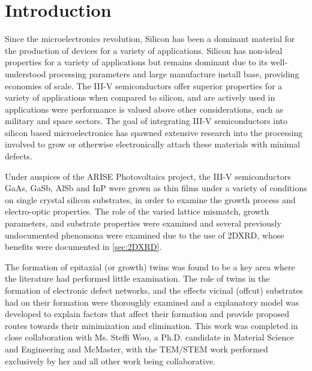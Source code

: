\section{Introduction}
Since the microelectronics revolution, Silicon has been a dominant material 
for the production of devices for a variety of applications. Silicon has 
non-ideal properties for a variety of applications but remains dominant due 
to its well-understood processing parameters and large manufacture install 
base, providing economies of scale. The III-V semiconductors offer superior 
properties for a variety of applications when compared to silicon, and are 
actively used in applications were performance is valued above other 
considerations, such as military and space sectors. The goal of integrating 
III-V semiconductors into silicon based microelectronics has spawned extensive 
research into the processing involved to grow or otherwise electronically 
attach these materials with minimal defects.

Under auspices of the ARISE Photovoltaics project, the III-V 
semiconductors GaAs, GaSb, AlSb and InP were grown as thin films under a 
variety of conditions on single crystal silicon substrates, in order to 
examine the growth process and electro-optic properties. The role of the 
varied lattice mismatch, growth parameters, and substrate properties were 
examined and several previously undocumented phenomona were examined due to 
the use of 2DXRD, whose benefits were documented in \cref{sec:2DXRD}.

The formation of epitaxial (or growth) twins was found to be a key area where 
the literature had performed little examination. The role of twins in the 
formation of electronic defect networks, and the effects vicinal (offcut) 
substrates had on their formation were thoroughly examined and a 
explanatory model was developed to explain factors that affect their formation 
and provide proposed routes towards their minimization and 
elimination\cite{Devenyi2011}. This work was completed in close collaboration 
with Ms. Steffi Woo, a Ph.D. candidate in Material Science and Engineering and 
McMaster, with the TEM/STEM work performed exclusively by her and all other 
work being collaborative.

